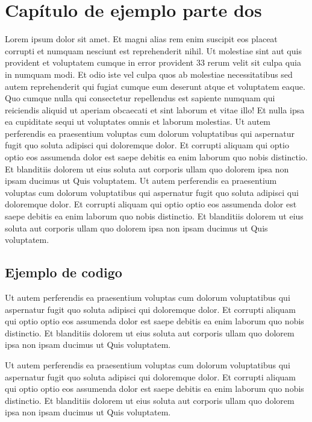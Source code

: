 
\titleformat{\chapter}[display]
    {\normalfont\Large\bfseries}{\filleft\chaptertitlename\ \thechapter}{20pt}{\Huge}
\chapter{Capítulo de ejemplo parte dos}
\justify
Lorem ipsum dolor sit amet. Et magni alias rem enim suscipit eos placeat corrupti et numquam nesciunt est reprehenderit nihil. Ut molestiae sint aut quis provident et voluptatem cumque in error provident 33 rerum velit sit culpa quia in numquam modi. Et odio iste vel culpa quos ab molestiae necessitatibus sed autem reprehenderit qui fugiat cumque eum deserunt atque et voluptatem eaque.
\newline
Quo cumque nulla qui consectetur repellendus est sapiente numquam qui reiciendis aliquid ut aperiam obcaecati et sint laborum et vitae illo! Et nulla ipsa ea cupiditate sequi ut voluptates omnis et laborum molestias.
\newline 
Ut autem perferendis ea praesentium voluptas cum dolorum voluptatibus qui aspernatur fugit quo soluta adipisci qui doloremque dolor. Et corrupti aliquam qui optio optio eos assumenda dolor est saepe debitis ea enim laborum quo nobis distinctio. Et blanditiis dolorem ut eius soluta aut corporis ullam quo dolorem ipsa non ipsam ducimus ut Quis voluptatem.
\newline
Ut autem perferendis ea praesentium voluptas cum dolorum voluptatibus qui aspernatur fugit quo soluta adipisci qui doloremque dolor. Et corrupti aliquam qui optio optio eos assumenda dolor est saepe debitis ea enim laborum quo nobis distinctio. Et blanditiis dolorem ut eius soluta aut corporis ullam quo dolorem ipsa non ipsam ducimus ut Quis voluptatem.
\section{Ejemplo de codigo}
    Ut autem perferendis ea praesentium voluptas cum dolorum voluptatibus qui aspernatur fugit quo soluta adipisci qui doloremque dolor. Et corrupti aliquam qui optio optio eos assumenda dolor est saepe debitis ea enim laborum quo nobis distinctio. Et blanditiis dolorem ut eius soluta aut corporis ullam quo dolorem ipsa non ipsam ducimus ut Quis voluptatem.\cite{github}
    
    Ut autem perferendis ea praesentium voluptas cum dolorum voluptatibus qui aspernatur fugit quo soluta adipisci qui doloremque dolor. Et corrupti aliquam qui optio optio eos assumenda dolor est saepe debitis ea enim laborum quo nobis distinctio. Et blanditiis dolorem ut eius soluta aut corporis ullam quo dolorem ipsa non ipsam ducimus ut Quis voluptatem.
